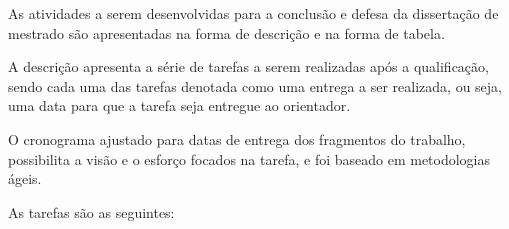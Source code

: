 
As atividades a serem desenvolvidas para a 
conclusão e defesa da dissertação de mestrado 
são apresentadas na forma de descrição e na forma de tabela.

A descrição apresenta a série de tarefas 
a serem realizadas após a qualificação, 
sendo cada uma das tarefas denotada como uma entrega a ser realizada, 
ou seja, uma data para que a tarefa seja entregue ao orientador.

O cronograma ajustado para datas de entrega dos fragmentos do trabalho,
 possibilita a visão e o esforço focados na tarefa, 
e foi baseado em metodologias ágeis.


As tarefas são as seguintes:

